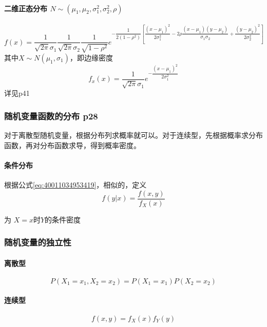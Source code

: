 \paragraph{二维正态分布 $N\sim (\mu_1,\mu_2,\sigma^2_1,\sigma^2_2,\rho )$}
\begin{equation*}
f(x)=\dfrac{1}{\sqrt{2\pi}\sigma_{1}} \dfrac{1}{\sqrt{2\pi}\sigma_{2}}
\dfrac{1}{\sqrt{1-\rho^2}}
e^{
	-\dfrac{1}{2(1-\rho^2)}
	\left[ 
	\dfrac{(x-\mu_{1})^{2}}{2\sigma_{1}^{2}}
	-2\rho\dfrac{(x-\mu_1)(y-\mu_2)}{\sigma_1 \sigma_2}
	+\dfrac{(y-\mu_{2})^{2}}{2\sigma_{2}^{2}}
\right] }
\end{equation*}
其中$X \sim N(\mu_1 ,\sigma_1)$，即边缘密度
\begin{equation*}
f_x(x)=\dfrac{1}{\sqrt{2\pi}\sigma_1}e^{-\dfrac{(x-\mu_1)^{2}}{2\sigma_1^{2}}}
\end{equation*}
详见p41


\subsubsection{随机变量函数的分布 p28}
对于离散型随机变量，根据分布列求概率就可以。对于连续型，先根据概率求分布函数，再对分布函数求导，得到概率密度。

\paragraph{条件分布}

根据公式\ref{eq:40011034953419}，相似的，定义
\begin{equation*}
  f(y|x)=\dfrac{f(x,y)}{f_{X}(x)}
\end{equation*}

为 $X=x$时$Y$的条件密度

\subsubsection{随机变量的独立性}

\paragraph{离散型}
\begin{equation*}
  P(X_{1}=x_{1},X_{2}=x_{2})=P(X_{1}=x_{1})P(X_{2}=x_{2})
\end{equation*}
\paragraph{连续型}
\begin{equation*}
  f(x,y)=f_{X}(x)f_{Y}(y)
\end{equation*}

